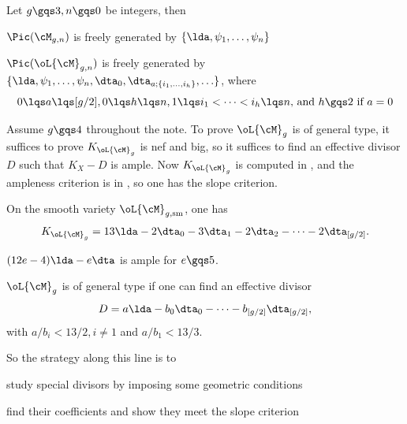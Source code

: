 \documentclass[a4paper, twoside]{article}
\begin{document}
\confighead{}{}{}




\begin{thm}[{\cite[Theorem~2]{AC1987}}]
	Let $g\gqs3,n\gqs0$ be integers, then
	\begin{enr}
		\item $\Pic(\cM_{g,n})$ is freely generated by $\{\lda,\psi_{1},\ldots,\psi_{n}\}$
		\item $\Pic(\oL{\cM}_{g,n})$ is freely generated by $\{\lda,\psi_{1},\ldots,\psi_{n},\dta_{0},\dta_{a;\{i_{1},\ldots,i_{h}\}},\ldots\}$, where
		\[
			\text{$0\lqs a\lqs[g/2], 0\lqs h\lqs n, 1\lqs i_{1}<\cdots<i_{h}\lqs n$, and $h\gqs2$ if $a=0$}
		\]
	\end{enr}
\end{thm}


Assume $g\gqs4$ throughout the note. To prove $\oL{\cM}_{g}$ is of general type, it suffices to prove $K_{\oL{\cM}_{g}}$ is nef and big, so it suffices to find an effective divisor $D$ such that $K_{X}-D$ is ample. Now $K_{\oL{\cM}_{g}}$ is computed in \cite{HM1982}, and the ampleness criterion is in \cite{Mumford1977Stability}, so one has the slope criterion.

\begin{thm}
	On the smooth variety $\oL{\cM}_{g,\mathrm{sm}}$, one has
	\[
		K_{\oL{\cM}_{g}}=13\lda-2\dta_{0}-3\dta_{1}-2\dta_{2}-\cdots-2\dta_{[g/2]}.
	\]
\end{thm}

\begin{thm}
	$(12e-4)\lda-e\dta$ is ample for $e\gqs5$.
\end{thm}

\begin{cor}
	$\oL{\cM}_{g}$ is of general type if one can find an effective divisor
	\[
		D=a\lda-b_{0}\dta_{0}-\cdots-b_{[g/2]}\dta_{[g/2]},
	\]
	with $a/b_{i}<13/2, i\neq1$ and $a/b_{1}<13/3$.
\end{cor}

\begin{rmk}
	So the strategy along this line is to
	\begin{enr}
		\item study special divisors by imposing some geometric conditions
		\item find their coefficients and show they meet the slope criterion
	\end{enr}
\end{rmk}
\end{document}

